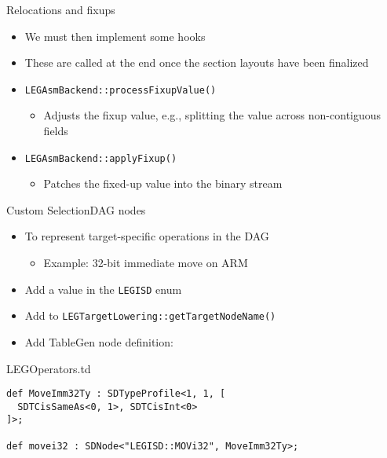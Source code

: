 
\begin{frame}{Relocations and fixups}

\begin{itemize}
    \item We must then implement some hooks
    \item These are called at the end once the section layouts have been finalized
    \item \texttt{LEGAsmBackend::processFixupValue()}
    \begin{itemize}
        \item Adjusts the fixup value, e.g., splitting the value across non-contiguous fields
    \end{itemize}
    \item \texttt{LEGAsmBackend::applyFixup()}
    \begin{itemize}
        \item Patches the fixed-up value into the binary stream
    \end{itemize}
\end{itemize}

\end{frame}


\begin{frame}[fragile]{Custom SelectionDAG nodes}

\begin{itemize}
    \item To represent target-specific operations in the DAG
    \begin{itemize}
        \item Example: 32-bit immediate move on ARM
    \end{itemize}
    \item Add a value in the \texttt{LEGISD} enum
    \item Add to \texttt{LEGTargetLowering::getTargetNodeName()}
    \item Add TableGen node definition:
\end{itemize}

\begin{block}{LEGOperators.td}
\begin{lstlisting}
def MoveImm32Ty : SDTypeProfile<1, 1, [
  SDTCisSameAs<0, 1>, SDTCisInt<0>
]>;

def movei32 : SDNode<"LEGISD::MOVi32", MoveImm32Ty>;
\end{lstlisting}
\end{block}

\end{frame}

